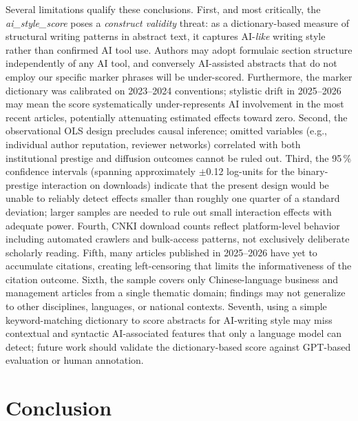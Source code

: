 \documentclass[12pt,a4paper]{article}
\begin{document}
Several limitations qualify these conclusions.
First, and most critically, the \textit{ai\_style\_score} poses a
\textit{construct validity} threat: as a dictionary-based measure
of structural writing patterns in abstract text,
it captures AI-\textit{like} writing style rather than confirmed
AI tool use.
Authors may adopt formulaic section structure independently of any AI
tool, and conversely AI-assisted abstracts that do not employ
our specific marker phrases will be under-scored.
Furthermore, the marker dictionary was calibrated on 2023--2024
conventions; stylistic drift in 2025--2026 may mean the score
systematically under-represents AI involvement in the most recent
articles, potentially attenuating estimated effects toward zero.
Second, the observational OLS design precludes causal inference;
omitted variables (e.g., individual author reputation, reviewer networks)
correlated with both institutional prestige and diffusion outcomes
cannot be ruled out.
Third, the 95\,\% confidence intervals (spanning approximately
$\pm$0.12 log-units for the binary-prestige interaction on downloads)
indicate that the present design would be unable to reliably detect
effects smaller than roughly one quarter of a standard deviation;
larger samples are needed to rule out small interaction effects with
adequate power.
Fourth, CNKI download counts reflect platform-level behavior including
automated crawlers and bulk-access patterns, not exclusively deliberate
scholarly reading.
Fifth, many articles published in 2025--2026 have yet to accumulate
citations, creating left-censoring that limits the informativeness of
the citation outcome.
Sixth, the sample covers only Chinese-language business and management
articles from a single thematic domain; findings may not generalize
to other disciplines, languages, or national contexts.
Seventh, using a simple keyword-matching dictionary to score abstracts
for AI-writing style may miss contextual and syntactic AI-associated
features that only a language model can detect; future work should
validate the dictionary-based score against GPT-based evaluation or
human annotation.

\section{Conclusion}
\label{sec:conclusion}
\end{document}
